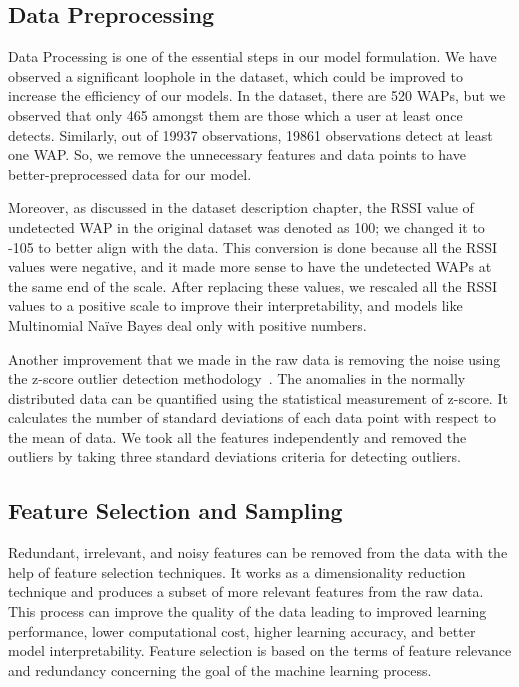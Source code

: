 \documentclass[a4paper,singleside,12pt]{report} %
\begin{document}
			\subsection{Data Preprocessing}

			Data Processing is one of the essential steps in our model formulation. We have observed a significant loophole in the dataset, which could be improved to increase the efficiency of our models. 
			In the dataset, there are 520 WAPs, but we observed that only 465 amongst them are those which a user at least once detects.
			Similarly, out of 19937 observations, 19861 observations detect at least one WAP. 
			So, we remove the unnecessary features and data points to have better-preprocessed data for our model.
			
			Moreover, as discussed in the dataset description chapter, the RSSI value of undetected WAP in the original dataset was denoted as 100; we changed it to -105 to better align with the data. 
			This conversion is done because all the RSSI values were negative, and it made more sense to have the undetected WAPs at the same end of the scale. 
			After replacing these values, we rescaled all the RSSI values to a positive scale to improve their interpretability, and models like Multinomial Naïve Bayes deal only with positive numbers.

			Another improvement that we made in the raw data is removing the noise using the z-score outlier detection methodology~\cite{eidleman1995z}. 
			The anomalies in the normally distributed data can be quantified using the statistical measurement of z-score.
			It calculates the number of standard deviations of each data point with respect to the mean of data.
			We took all the features independently and removed the outliers by taking three standard deviations criteria for detecting outliers. 

			\subsection{Feature Selection and Sampling}

			Redundant, irrelevant, and noisy features can be removed from the data with the help of feature selection techniques. It works as a dimensionality reduction technique and produces a subset of more relevant features from the raw data. 
			This process can improve the quality of the data leading to improved learning performance, lower computational cost, higher learning accuracy, and better model interpretability.
			Feature selection is based on the terms of feature relevance and redundancy concerning the goal of the machine learning process.
			
\end{document}
